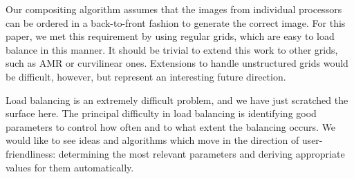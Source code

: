 Our compositing algorithm assumes that the images from individual
processors can be ordered in a back-to-front fashion to generate the
correct image. For this paper, we met this requirement by using regular
grids, which are easy to load balance in this manner. It should be
trivial to extend this work to other grids, such as AMR or curvilinear ones.
Extensions to handle unstructured grids would be difficult, however,
but represent an interesting future direction.

Load balancing is an extremely difficult problem, and we have just
scratched the surface here. The principal difficulty in load balancing
is identifying good parameters to control how often and to what extent
the balancing occurs. We would like to see ideas and algorithms
which move in the direction of user-friendliness: determining the
most relevant parameters and deriving appropriate values for them
automatically.
